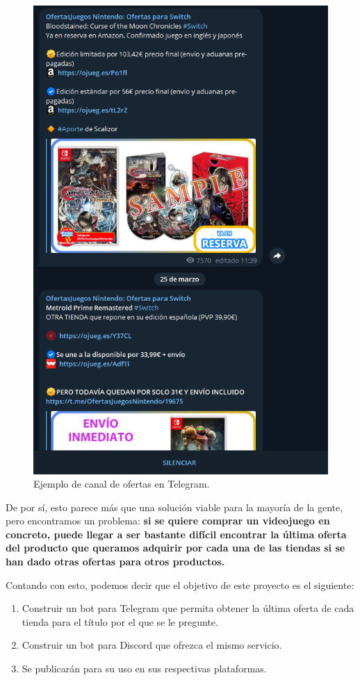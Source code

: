 \begin{figure}[h]
    \centering
    \includegraphics[scale=0.57]{figuras/canal_telegram_ofertas}
    \caption{Ejemplo de canal de ofertas en Telegram.}
    \label{fig:canal_telegram_ofertas}
\end{figure}

De por sí, esto parece más que una solución viable para la mayoría de la gente, pero encontramos un problema: \textbf{si se quiere comprar un videojuego en 
concreto, puede llegar a ser bastante difícil encontrar la última oferta del producto que queramos adquirir por cada una de las tiendas si se han dado 
otras ofertas para otros productos.}

Contando con esto, podemos decir que el objetivo de este proyecto es el siguiente:

\begin{enumerate}
    \item{Construir un bot para Telegram que permita obtener la última oferta de cada tienda para el título por el que se le pregunte.}
    \item{Construir un bot para Discord que ofrezca el mismo servicio.}
    \item{Se publicarán para su uso en sus respectivas plataformas.}
\end{enumerate}
